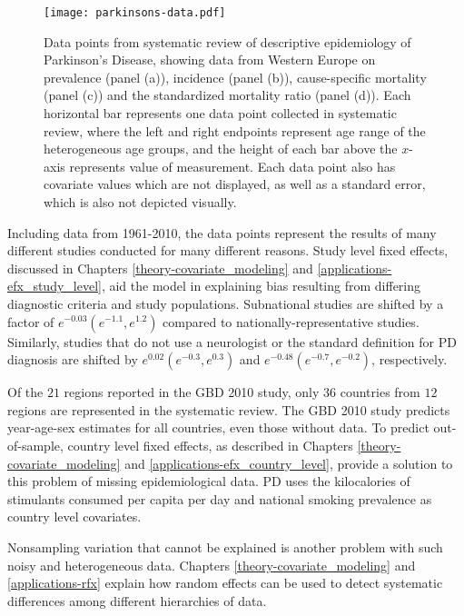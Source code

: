     \begin{figure}[h]
        \begin{center}
            \texttt{[image: parkinsons-data.pdf]}
            \caption{Data points from systematic review of descriptive
              epidemiology of Parkinson's Disease, showing data from
              Western Europe on prevalence (panel (a)), incidence
              (panel (b)), cause-specific mortality (panel (c)) and
              the standardized mortality ratio (panel (d)).  Each
              horizontal bar represents one data point collected in
              systematic review, where the left and right endpoints
              represent age range of the heterogeneous age groups, and
              the height of each bar above the $x$-axis represents
              value of measurement.  Each data point also has
              covariate values which are not displayed, as well as a
              standard error, which is also not depicted visually.}
            \label{fig:intro-parkinsons data}
        \end{center}
    \end{figure}

Including data from 1961-2010, the data points represent the results
of many different studies conducted for many different reasons.  Study
level fixed effects, discussed in Chapters \ref{theory-covariate_modeling} and
\ref{applications-efx_study_level}, aid the model in explaining bias
resulting from differing diagnostic criteria and study populations.  Subnational
studies are shifted by a factor of $e^{-0.03} (e^{-1.1}, e^{1.2})$
compared to nationally-representative studies.  Similarly, studies that
do not use a neurologist or the standard definition for PD diagnosis are shifted
by $e^{0.02} (e^{-0.3}, e^{0.3})$ and $e^{-0.48} (e^{-0.7}, e^{-0.2})$,
respectively.

Of the $21$ regions reported in the GBD 2010 study, only $36$ countries
from $12$ regions are represented in the systematic review.  The GBD
2010 study predicts year-age-sex estimates for all countries, even
those without data.  To predict out-of-sample, country level fixed
effects, as described in Chapters \ref{theory-covariate_modeling} and
\ref{applications-efx_country_level}, provide a solution to this
problem of missing epidemiological data.  PD uses the
kilocalories of stimulants consumed per capita per day and national smoking prevalence
as country level covariates.

Nonsampling variation that cannot be explained is another problem with
such noisy and heterogeneous data.  Chapters
\ref{theory-covariate_modeling} and \ref{applications-rfx} explain how
random effects can be used to detect systematic differences among
different hierarchies of data.

